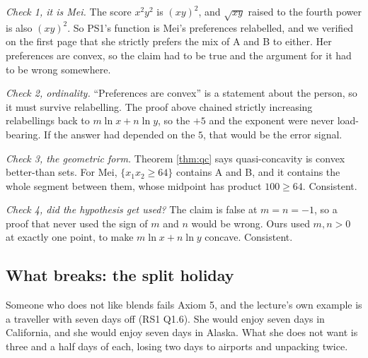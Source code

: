 \documentclass[11pt,letterpaper]{article}
\theoremstyle{definition}
\theoremstyle{plain}
\newcommand{\src}[1]{{\small\textsf{(#1)}}}
\begin{document}
\emph{Check 1, it is Mei.} The score $x^2 y^2$ is $(xy)^2$, and $\sqrt{xy}$ raised to the fourth
power is also $(xy)^2$. So PS1's function is Mei's preferences relabelled, and we verified on the
first page that she strictly prefers the mix of A and B to either. Her preferences are convex, so
the claim had to be true and the argument for it had to be wrong somewhere.

\emph{Check 2, ordinality.} ``Preferences are convex'' is a statement about the person, so it must
survive relabelling. The proof above chained strictly increasing relabellings back to
$m \ln x + n \ln y$, so the $+5$ and the exponent were never load-bearing. If the answer had depended
on the $5$, that would be the error signal.

\emph{Check 3, the geometric form.} Theorem \ref{thm:qc} says quasi-concavity is convex better-than
sets. For Mei, $\{x_1 x_2 \ge 64\}$ contains A and B, and it contains the whole segment between them,
whose midpoint has product $100 \ge 64$. Consistent.

\emph{Check 4, did the hypothesis get used?} The claim is false at $m = n = -1$, so a proof that
never used the sign of $m$ and $n$ would be wrong. Ours used $m, n > 0$ at exactly one point, to make
$m\ln x + n \ln y$ concave. Consistent.

\subsection{What breaks: the split holiday}

Someone who does not like blends fails Axiom 5, and the lecture's own example is a traveller with
seven days off \src{RS1 Q1.6}. She would enjoy seven days in California, and she would enjoy seven
days in Alaska. What she does not want is three and a half days of each, losing two days to airports
and unpacking twice.
\end{document}
